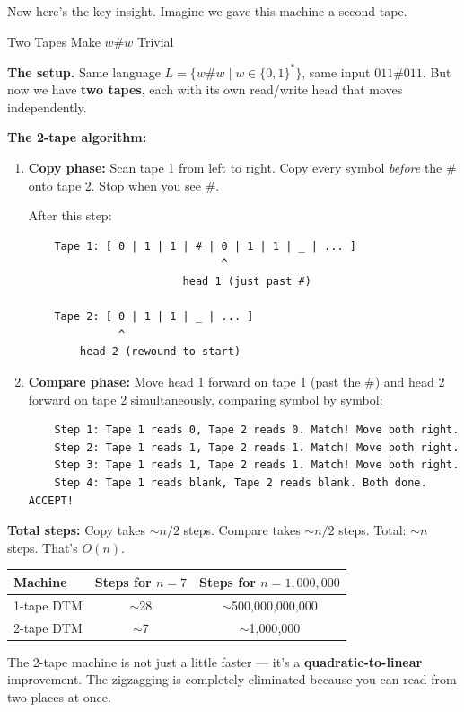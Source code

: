 Now here's the key insight. Imagine we gave this machine a second tape.

\begin{examplebox}{Two Tapes Make $w\#w$ Trivial}

\textbf{The setup.} Same language $L = \{w\#w \mid w \in \{0,1\}^*\}$, same input $011\#011$. But now we have \textbf{two tapes}, each with its own read/write head that moves independently.

\textbf{The 2-tape algorithm:}
\begin{enumerate}[nosep]
\item \textbf{Copy phase:} Scan tape 1 from left to right. Copy every symbol \textit{before} the \# onto tape 2. Stop when you see \#.

After this step:
\begin{lstlisting}
    Tape 1: [ 0 | 1 | 1 | # | 0 | 1 | 1 | _ | ... ]
                              ^
                        head 1 (just past #)

    Tape 2: [ 0 | 1 | 1 | _ | ... ]
              ^
        head 2 (rewound to start)
\end{lstlisting}

\item \textbf{Compare phase:} Move head 1 forward on tape 1 (past the \#) and head 2 forward on tape 2 simultaneously, comparing symbol by symbol:
\begin{lstlisting}
    Step 1: Tape 1 reads 0, Tape 2 reads 0. Match! Move both right.
    Step 2: Tape 1 reads 1, Tape 2 reads 1. Match! Move both right.
    Step 3: Tape 1 reads 1, Tape 2 reads 1. Match! Move both right.
    Step 4: Tape 1 reads blank, Tape 2 reads blank. Both done. ACCEPT!
\end{lstlisting}
\end{enumerate}

\textbf{Total steps:} Copy takes $\sim n/2$ steps. Compare takes $\sim n/2$ steps. Total: $\sim n$ steps. That's $O(n)$.

\begin{center}
\begin{tabular}{lcc}
\toprule
\textbf{Machine} & \textbf{Steps for $n=7$} & \textbf{Steps for $n=1{,}000{,}000$} \\
\midrule
1-tape DTM & $\sim$28 & $\sim$500{,}000{,}000{,}000 \\
2-tape DTM & $\sim$7 & $\sim$1{,}000{,}000 \\
\bottomrule
\end{tabular}
\end{center}

The 2-tape machine is not just a little faster --- it's a \textbf{quadratic-to-linear} improvement. The zigzagging is completely eliminated because you can read from two places at once.
\end{examplebox}

